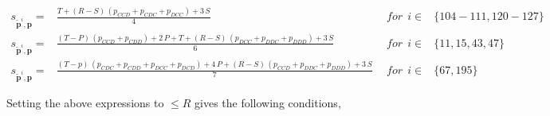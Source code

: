 \documentclass{article}
\theoremstyle{definition}
\begin{document}
\begin{equation*}
\begin{array}{lcll}
    s_{\mathbf{\tilde{p}}^{i}, \mathbf{p}} = & \frac{T  + (R - S)\, (p_{CCD} + p_{CDC} + p_{DCC}) + 3\,S}{4} &~~for~~ i \in & \{ 104\!-\!111, 120\!- \!127\} \\ [0.2cm]
    s_{\mathbf{\tilde{p}}^{i}, \mathbf{p}} = & \frac{(T - P)\, (p_{CCD} + p_{CDD}) + 2\,P + T + (R - S)\, (p_{DCC} + p_{DDC} + p_{DDD}) + 3\,S}{6} &~~for~~ i \in & \{11, 15, 43, 47\}\\ [0.2cm]
    s_{\mathbf{\tilde{p}}^{i}, \mathbf{p}} = & \frac{(T - p)\, (p_{CDC} + p_{CDD} + p_{DCC} + p_{DCD}) + 4\,P + (R - S)\, (p_{CCD} + p_{DDC} + p_{DDD}) + 3\,S}{7} &~~for~~ i \in & \{67, 195\}
\end{array}
\end{equation*}

Setting the above expressions to $\leq R$ gives the following conditions,
\end{document}
